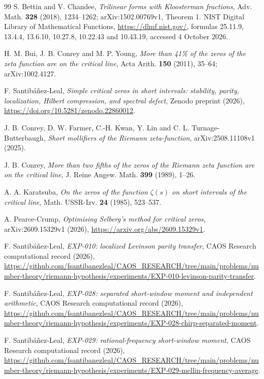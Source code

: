 \documentclass[11pt]{article}
\theoremstyle{remark}
\begin{document}
\begin{thebibliography}{99}
 S. Bettin and V. Chandee,
\emph{Trilinear forms with Kloosterman fractions}, Adv. Math.
\textbf{328} (2018), 1234--1262; arXiv:1502.00769v1, Theorem 1.
 NIST Digital Library of Mathematical Functions,
\url{https://dlmf.nist.gov/}, formulas 25.11.9, 13.4.4, 13.6.10, 10.27.8,
10.22.43 and 10.43.19, accessed 4 October 2026.

\raggedright

H. M. Bui, J. B. Conrey and M. P. Young,
\emph{More than 41\% of the zeros of the zeta function are on the critical
line}, Acta Arith. \textbf{150} (2011), 35--64; arXiv:1002.4127.

F. Santib\'a\~nez-Leal,
\emph{Simple critical zeros in short intervals: stability, parity,
localization, Hilbert compression, and spectral defect},
Zenodo preprint (2026),
\url{https://doi.org/10.5281/zenodo.22860012}.

J. B. Conrey, D. W. Farmer, C.-H. Kwan, Y. Lin and
C. L. Turnage-Butterbaugh,
\emph{Short mollifiers of the Riemann zeta-function},
arXiv:2508.11108v1 (2025).

J. B. Conrey,
\emph{More than two fifths of the zeros of the Riemann zeta function are on
the critical line}, J. Reine Angew. Math. \textbf{399} (1989), 1--26.

A. A. Karatsuba,
\emph{On the zeros of the function $\zeta(s)$ on short intervals of the
critical line}, Math. USSR-Izv. \textbf{24} (1985), 523--537.

A. Pearce-Crump,
\emph{Optimising Selberg's method for critical zeros},
arXiv:2609.15329v1 (2026),
\url{https://arxiv.org/abs/2609.15329v1}.

F. Santib\'a\~nez-Leal,
\emph{EXP-010: localized Levinson parity transfer},
CAOS Research computational record (2026),
\url{https://github.com/fsantibanezleal/CAOS_RESEARCH/tree/main/problems/number-theory/riemann-hypothesis/experiments/EXP-010-levinson-parity-transfer}.

F. Santib\'a\~nez-Leal,
\emph{EXP-028: separated short-window moment and independent arithmetic},
CAOS Research computational record (2026),
\url{https://github.com/fsantibanezleal/CAOS_RESEARCH/tree/main/problems/number-theory/riemann-hypothesis/experiments/EXP-028-chirp-separated-moment}.

F. Santib\'a\~nez-Leal,
\emph{EXP-029: rational-frequency short-window moment},
CAOS Research computational record (2026),
\url{https://github.com/fsantibanezleal/CAOS_RESEARCH/tree/main/problems/number-theory/riemann-hypothesis/experiments/EXP-029-mellin-frequency-average}.


\end{thebibliography}
\end{document}
